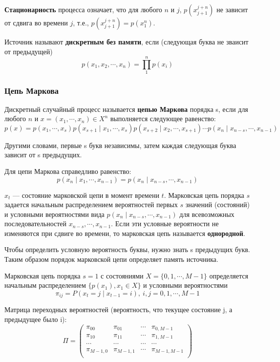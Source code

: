 \textbf{Стационарность} процесса означает, что для любого $n$ и $j$, $p(x^{j+n}_{j+1})$
не зависит от сдвига во времени $j$, т.е., $p(x^{j+n}_{j+1}) = p(x^n_1)$.

Источник называют \textbf{дискретным без памяти}, если (следующая буква не
зваисит от предыдущей)
\[
    p(x_1, x_2, \cdots, x_n) = \prod_1^n p(x_i)
\]

\subsubsection{Цепь Маркова}

Дискретный случайный процесс называется \textbf{цепью Маркова} порядка s, если для
любого $n$ и $x = (x_1, \cdots, x_n) \in X^n$ выполняется следующее равенство:
\[
    p(x) = p(x_1, \cdots, x_s)
        p(x_{s+1} \mid x_1, \cdots, x_s)
        p(x_{s+2} \mid x_2, \cdots, x_{s+1}) \cdots p(x_n \mid x_{n-s}, \cdots,
        x_{n-1})
\]

Другими словами, первые s букв независимы, затем каждая следующая буква зависит
от s предыдущих.

Для цепи Маркова справедливо равенство:
\[
    p(x_n \mid x_1, \cdots, x_{n-1}) = p(x_n \mid x_{n-s}, \cdots, x_{n-1})
\]

$x_t$ --- состояние марковской цепи в момент времени $t$. Марковская цепь
порядка $s$ задается начальным распределением вероятностей первых $s$ значений
(состояний) и условными вероятностями вида $p(x_n \mid x_{n-s}, \cdots,
x_{n-1})$ для всевозможных последовательностей $x_{n-s}, \cdots, x_{n-1}$. Если
эти условные вероятности не изменяются при сдвиге во времени, то марковская
цепь называется \textbf{однородной}.

Чтобы определить условную вероятность буквы, нужно знать s предыдущих букв.
Таким образом порядок марковской цепи определяет память источника.

Марковская цепь порядка $s = 1$ с состояниями $X = \{ 0, 1, \cdots, M - 1 \}$
определяется начальным распределением $\{ p(x_1), x_1 \in X \}$ и условными
вероятностями
\[
    \pi_{ij} = P(x_t = j \mid x_{t - 1} = i),\ i,j = 0, 1, \cdots, M - 1
\]

Матрица переходных вероятностей (вероятность, что текущее состояние j, а
предыдущее было i):
\[
    \Pi =
    \begin{pmatrix}
        \pi_{00} & \pi_{01} & \cdots & \pi_{0, M-1}
        \\
        \pi_{10} & \pi_{11} & \cdots & \pi_{1, M-1}
        \\
        \cdots & \cdots & \cdots & \cdots
        \\
        \pi_{M-1, 0} & \pi_{M-1, 1} & \cdots & \pi_{M-1, M-1}
        \\
    \end{pmatrix}
\]

